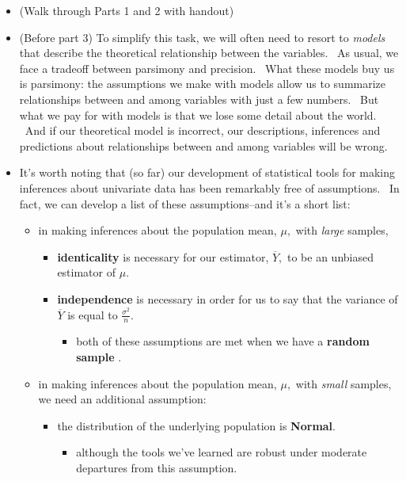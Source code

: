 \documentclass[11pt]{article}
\begin{document}
\begin{itemize}
\item (Walk through Parts 1 and 2 with handout)

\item (Before part 3) To simplify this task, we will often need to resort to 
\textit{models }that describe the theoretical relationship between the
variables. \ As usual, we face a tradeoff between parsimony and precision. \
What these models buy us is parsimony: the assumptions we make with models
allow us to summarize relationships between and among variables with just a
few numbers. \ But what we pay for with models is that we lose some detail
about the world. \ And if our theoretical model is incorrect, our
descriptions, inferences and predictions about relationships between and
among variables will be wrong. \ 

\item It's worth noting that (so far) our development of statistical tools
for making inferences about univariate data has been remarkably free of
assumptions. \ In fact, we can develop a list of these assumptions--and it's
a short list:

\begin{itemize}
\item in making inferences about the population mean, $\mu ,$ with \textit{%
large} samples,

\begin{itemize}
\item \textbf{identicality} is necessary for our estimator, $\overline{Y},$
to be an unbiased estimator of $\mu .$

\item \textbf{independence }is necessary in order for us to say that the
variance of $\overline{Y}$ is equal to $\frac{\sigma ^{2}}{n}.$

\begin{itemize}
\item both of these assumptions are met when we have a \textbf{random sample}%
.
\end{itemize}
\end{itemize}

\item in making inferences about the population mean, $\mu ,$ with \textit{%
small} samples, we need an additional assumption:

\begin{itemize}
\item the distribution of the underlying population is \textbf{Normal}.

\begin{itemize}
\item although the tools we've learned are robust under moderate departures
from this assumption.
\end{itemize}
\end{itemize}


\end{itemize}
\end{itemize}
\end{document}
